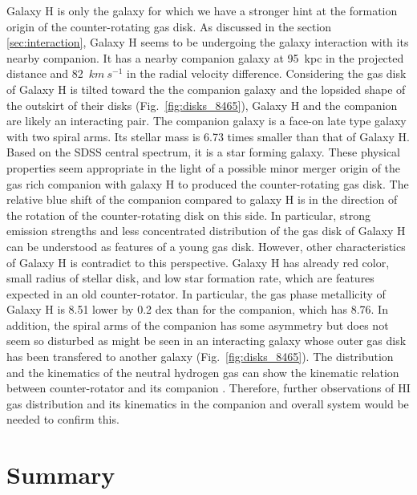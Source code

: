 \documentclass[fleqn,usenatbib]{mnras}
\begin{document}
Galaxy H is only the galaxy for which we have a stronger hint  
at the formation origin of the counter-rotating gas disk. 
As discussed in the section \ref{sec:interaction},
Galaxy H seems to be undergoing the galaxy interaction with its nearby companion.
It has a nearby companion galaxy at 
95~kpc in the projected distance and 82~$km~s^{-1}$ in the radial velocity difference. 
Considering the gas disk of Galaxy H is tilted toward the the companion galaxy
and the lopsided shape of the outskirt of their disks (Fig.~\ref{fig:disks_8465}), 
Galaxy H and the companion are likely an interacting pair. 
The companion galaxy is a face-on late type galaxy with two spiral arms.
Its stellar mass is 6.73 times smaller than that of Galaxy H. 
Based on the SDSS central spectrum, it is a star forming galaxy.
These physical properties seem appropriate in the light of a possible
minor merger origin of the gas rich companion with galaxy H to produced
the counter-rotating gas disk. The relative blue shift of the companion compared to galaxy H is in the direction of the rotation of the counter-rotating disk on this side.
In particular, strong emission strengths and 
less concentrated distribution of the gas disk of Galaxy H 
can be understood as features of a young gas disk. 
However, other characteristics of Galaxy H 
is contradict to this perspective.
Galaxy H has already red color, small radius of stellar disk,
and  low star formation rate, which are 
features expected in an old counter-rotator.
In particular, the gas phase metallicity of Galaxy H 
is 8.51 lower by 0.2 dex than for the companion, which has 8.76. 
In addition, the spiral arms of the companion has some asymmetry but does not seem so disturbed as might be seen in an interacting galaxy 
whose outer gas disk has been transfered to another galaxy (Fig.~\ref{fig:disks_8465}).
The distribution and the kinematics of the neutral hydrogen gas 
can show the kinematic relation between counter-rotator and its companion
\citep{BureauChung,Chung2012}.
Therefore, further observations of HI gas distribution and its kinematics
in the companion and overall system would be needed to confirm this. 


\section{Summary}
\end{document}
